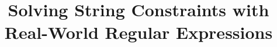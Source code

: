\documentclass{llncs}
\begin{document}
\title{Solving String Constraints with \\
Real-World Regular Expressions}



\author{}
\institute{}

\maketitle


\vspace{-8mm}

\end{document}
